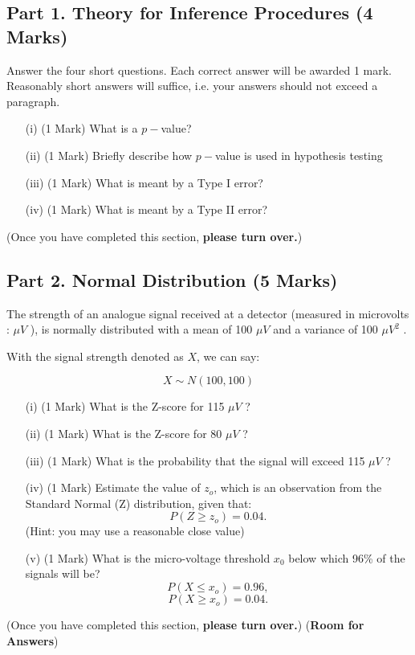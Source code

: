 


\subsection*{Part 1. Theory for Inference Procedures (4 Marks)}
Answer the four short questions. Each correct answer will be awarded 1 mark. Reasonably short answers will suffice, i.e. your answers should not exceed a paragraph.
\begin{itemize}
\item[(i)] (1 Mark) What is a $p-$value?
\item[(ii)] (1 Mark) Briefly describe how $p-$value is used in hypothesis testing
\item[(iii)] (1 Mark) What is meant by a Type I error?
\item[(iv)] (1 Mark) What is meant by a Type II error?
\end{itemize}
(Once you have completed this section, \textbf{please turn over.})
\newpage
\subsection*{Part 2. Normal Distribution (5 Marks)}
The strength of an analogue signal received at a detector (measured in microvolts : $\mu V$ ), is normally distributed with a mean of 100 $\mu V$  
and a variance of 100 $\mu V^2$ . 


\noindent With the signal strength denoted as $X$, we can say:

\[ X \sim N(100,100) \]

\begin{itemize}
\item[(i)] (1 Mark) What is the Z-score for 115 $\mu V$ ? 
\item[(ii)] (1 Mark) What is the Z-score for 80 $\mu V$ ?
\item[(iii)] (1 Mark) What is the probability that the signal will exceed 115 $\mu V$ ? 
\item[(iv)] (1 Mark) Estimate the value of $z_o$, which is an observation from the Standard Normal (Z) distribution, given that:
\[  P(Z \geq z_o) = 0.04.\] 
(Hint: you may use a reasonable close value)
\item[(v)] (1 Mark) What is the micro-voltage threshold $x_0$ below which 96\% of the signals will be? 
\[  P(X \leq x_o) = 0.96,\] 
\[  P(X \geq x_o) = 0.04.\]
\end{itemize}
(Once you have completed this section, \textbf{please turn over.})
\newpage
(\textbf{Room for Answers})
\newpage
